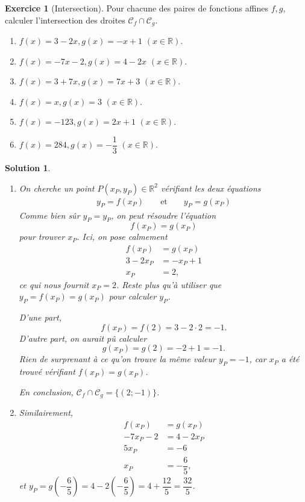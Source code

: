\documentclass[12pt]{paper}
\theoremstyle{plain}
\newtheorem*{sol}{Solution}
\theoremstyle{definition}
\newtheorem{ex}{Exercice}
\newcommand{\C}{\mathcal{C}}
\newcommand{\R}{\mathbb{R}}
\newcommand{\exe}[2]{
		\begin{ex} #1  \end{ex}
		\begin{sol} #2 \end{sol}
	}
\newcommand{\exe}[2]{
		\begin{ex} #1  \end{ex}
	}
\begin{document}
\exe{[Intersection]
	Pour chacune des paires de fonctions affines $f,g$, calculer l'intersection des droites $\C_f \cap \C_g$.
	
	\begin{multicols}{2}
	\begin{enumerate}
		\item $f(x) = 3-2x, g(x) = -x+1$ $(x\in\R)$.
		\item $f(x) = -7x -2, g(x) = 4-2x$ $(x\in\R)$.
		\item $f(x) = 3+7x, g(x) = 7x+3$ $(x\in\R)$.
		\item $f(x) = x, g(x) = 3$ $(x\in\R)$.
		\item $f(x) = -123, g(x) = 2x+1$ $(x\in\R)$.
		\item $f(x) = 284, g(x) = -\dfrac13$ $(x\in\R)$.
	\end{enumerate}
	\end{multicols}
}{

	\begin{enumerate}
		\item 
			On cherche un point $P(x_P, y_P) \in \R^2$ vérifiant les deux équations
				\begin{align*}
					y_P = f(x_P) && \text{ et } && y_P = g(x_P)
				\end{align*}
			Comme bien sûr $y_P = y_P$, on peut résoudre l'équation
				\[ f(x_P) = g(x_P) \]
			pour trouver $x_P$.
			Ici, on pose calmement
				\begin{align*}
					f(x_P) &= g(x_P) \\
					3 - 2x_P &= -x_P + 1 \\
					x_P &= 2,
				\end{align*}
			ce qui nous fournit $x_P = 2$.
			Reste plus qu'à utiliser que $y_P = f(x_P) = g(x_P)$ pour calculer $y_P$.
			
			D'une part, 
				\[ f(x_P) = f(2) = 3-2\cdot2 = -1. \]
			D'autre part, on aurait pû calculer
				\[ g(x_P) = g(2) = -2 + 1 = -1. \]
			Rien de surprenant à ce qu'on trouve la même valeur $y_P = -1$, car $x_P$ a été trouvé vérifiant $f(x_P) = g(x_P)$.
			
			En conclusion, $\C_f \cap \C_g = \{ (2;-1) \}$.
			
		\item 
			Similairement,
			\begin{align*}
				f(x_P) &= g(x_P) \\
				-7x_P -2 & = 4-2x_P \\
				5x_P &= -6 \\
				x_P &= -\dfrac65,
			\end{align*}
			et $y_P = g\left(-\dfrac65\right) = 4-2\left(-\dfrac65\right) = 4+\dfrac{12}5 = \dfrac{32}5$.
			

\end{enumerate}}
\end{document}
